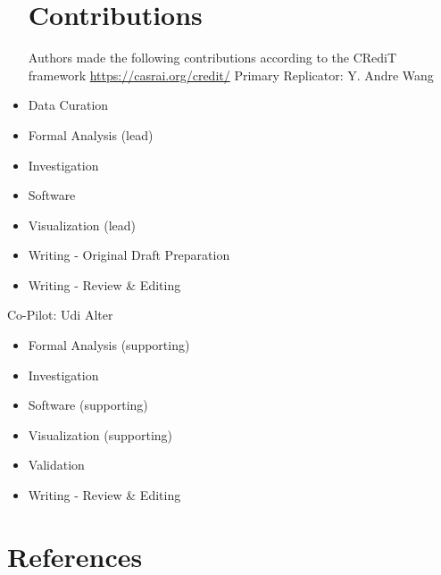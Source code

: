\documentclass[10,a4paperpaper,]{article}
\begin{document}
\begin{itemize}
  \section*{Contributions}

  Authors made the following contributions according to the CRediT
  framework \url{https://casrai.org/credit/} Primary Replicator: Y.
  Andre Wang
\item
  Data Curation\\
\item
  Formal Analysis (lead)\\
\item
  Investigation\\
\item
  Software\\
\item
  Visualization (lead)\\
\item
  Writing - Original Draft Preparation\\
\item
  Writing - Review \& Editing
\end{itemize}

Co-Pilot: Udi Alter

\begin{itemize}
\tightlist
\item
  Formal Analysis (supporting)\\
\item
  Investigation\\
\item
  Software (supporting)\\
\item
  Visualization (supporting)\\
\item
  Validation\\
\item
  Writing - Review \& Editing
\end{itemize}

\section*{References}
\begingroup
\hphantom{x}
\setlength{\parindent}{-0.5in}
\setlength{\leftskip}{0.5in}

\hypertarget{refs}{}
\begin{CSLReferences}{0}{0}
\end{CSLReferences}

\FloatBarrier
\endgroup
\newpage
\end{document}

